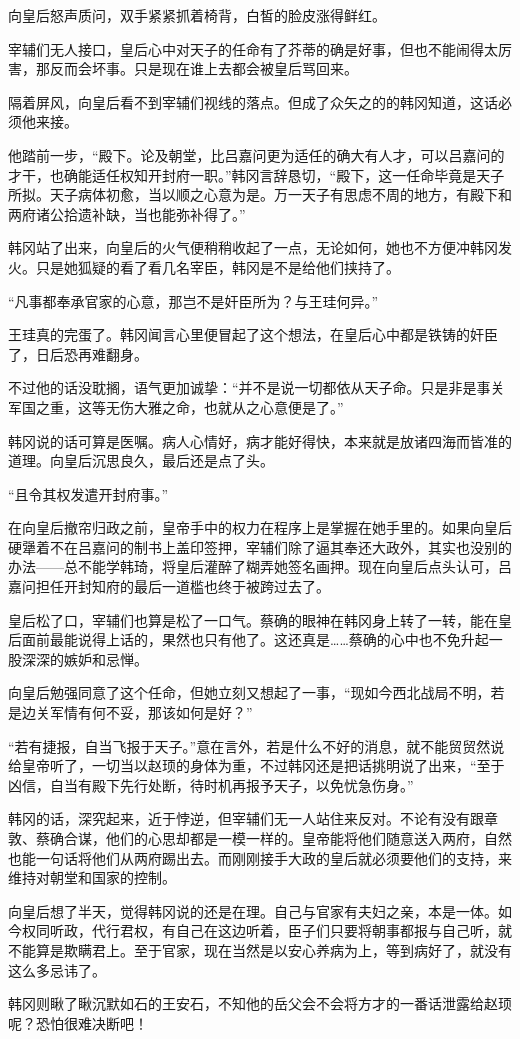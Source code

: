 向皇后怒声质问，双手紧紧抓着椅背，白皙的脸皮涨得鲜红。

宰辅们无人接口，皇后心中对天子的任命有了芥蒂的确是好事，但也不能闹得太厉害，那反而会坏事。只是现在谁上去都会被皇后骂回来。

隔着屏风，向皇后看不到宰辅们视线的落点。但成了众矢之的的韩冈知道，这话必须他来接。

他踏前一步，“殿下。论及朝堂，比吕嘉问更为适任的确大有人才，可以吕嘉问的才干，也确能适任权知开封府一职。”韩冈言辞恳切，“殿下，这一任命毕竟是天子所拟。天子病体初愈，当以顺之心意为是。万一天子有思虑不周的地方，有殿下和两府诸公拾遗补缺，当也能弥补得了。”

韩冈站了出来，向皇后的火气便稍稍收起了一点，无论如何，她也不方便冲韩冈发火。只是她狐疑的看了看几名宰臣，韩冈是不是给他们挟持了。

“凡事都奉承官家的心意，那岂不是奸臣所为？与王珪何异。”

王珪真的完蛋了。韩冈闻言心里便冒起了这个想法，在皇后心中都是铁铸的奸臣了，日后恐再难翻身。

不过他的话没耽搁，语气更加诚挚：“并不是说一切都依从天子命。只是非是事关军国之重，这等无伤大雅之命，也就从之心意便是了。”

韩冈说的话可算是医嘱。病人心情好，病才能好得快，本来就是放诸四海而皆准的道理。向皇后沉思良久，最后还是点了头。

“且令其权发遣开封府事。”

在向皇后撤帘归政之前，皇帝手中的权力在程序上是掌握在她手里的。如果向皇后硬犟着不在吕嘉问的制书上盖印签押，宰辅们除了逼其奉还大政外，其实也没别的办法——总不能学韩琦，将皇后灌醉了糊弄她签名画押。现在向皇后点头认可，吕嘉问担任开封知府的最后一道槛也终于被跨过去了。

皇后松了口，宰辅们也算是松了一口气。蔡确的眼神在韩冈身上转了一转，能在皇后面前最能说得上话的，果然也只有他了。这还真是……蔡确的心中也不免升起一股深深的嫉妒和忌惮。

向皇后勉强同意了这个任命，但她立刻又想起了一事，“现如今西北战局不明，若是边关军情有何不妥，那该如何是好？”

“若有捷报，自当飞报于天子。”意在言外，若是什么不好的消息，就不能贸贸然说给皇帝听了，一切当以赵顼的身体为重，不过韩冈还是把话挑明说了出来，“至于凶信，自当有殿下先行处断，待时机再报予天子，以免忧急伤身。”

韩冈的话，深究起来，近于悖逆，但宰辅们无一人站住来反对。不论有没有跟章敦、蔡确合谋，他们的心思却都是一模一样的。皇帝能将他们随意送入两府，自然也能一句话将他们从两府踢出去。而刚刚接手大政的皇后就必须要他们的支持，来维持对朝堂和国家的控制。

向皇后想了半天，觉得韩冈说的还是在理。自己与官家有夫妇之亲，本是一体。如今权同听政，代行君权，有自己在这边听着，臣子们只要将朝事都报与自己听，就不能算是欺瞒君上。至于官家，现在当然是以安心养病为上，等到病好了，就没有这么多忌讳了。

韩冈则瞅了瞅沉默如石的王安石，不知他的岳父会不会将方才的一番话泄露给赵顼呢？恐怕很难决断吧！
